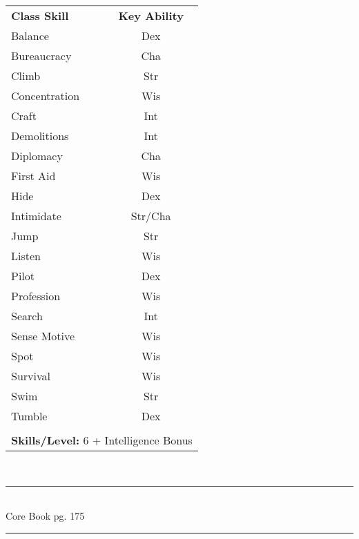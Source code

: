 \begin{table}[htb]
\raggedright
\begin{tabular}{l c}
\textbf{Class Skill} & \textbf{Key Ability}\\

Balance & Dex\\
Bureaucracy & Cha\\
Climb & Str\\
Concentration & Wis\\
Craft & Int\\
Demolitions & Int\\
Diplomacy & Cha\\
First Aid & Wis\\
Hide & Dex\\
Intimidate & Str/Cha\\
Jump & Str\\
Listen & Wis\\
Pilot & Dex\\
Profession & Wis\\
Search & Int\\
Sense Motive & Wis\\
Spot & Wis\\
Survival & Wis\\
Swim & Str\\
Tumble & Dex\\


\multicolumn{2}{l}{\cellcolor{white}}\\
\multicolumn{2}{l}{\cellcolor{white}\textbf{Skills/Level:} 6 + Intelligence Bonus}\\
\end{tabular}
\end{table}



\vspace*{\fill}

\begin{center}
\textsc{\Large}\\[0.25cm]
\rule{\linewidth}{0.5mm}\\[0.6cm]
\fontsize{30}{30} \selectfont Core Book pg. 175\\
\rule{\linewidth}{0.5mm}\\[0.6cm]
\vfill
\end{center}

\pagebreak



